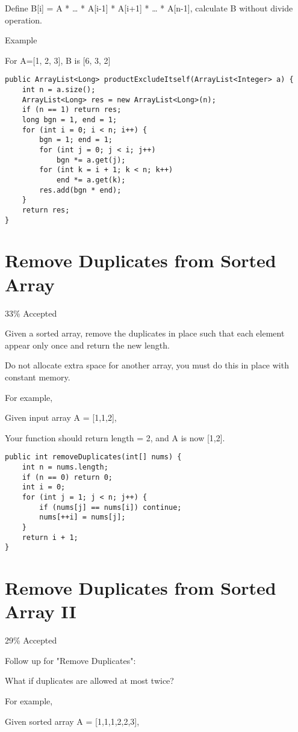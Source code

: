 \documentclass[9pt, b5paaper]{book}
\begin{document}
Define B[i] = A\footnotemark[1]{} * \ldots{} * A[i-1] * A[i+1] * \ldots{} * A[n-1], calculate B without divide operation.

Example

For A=[1, 2, 3], B is [6, 3, 2]
\begin{verbatim}
public ArrayList<Long> productExcludeItself(ArrayList<Integer> a) {
    int n = a.size();
    ArrayList<Long> res = new ArrayList<Long>(n);
    if (n == 1) return res;
    long bgn = 1, end = 1;
    for (int i = 0; i < n; i++) {
        bgn = 1; end = 1;
        for (int j = 0; j < i; j++) 
            bgn *= a.get(j);
        for (int k = i + 1; k < n; k++) 
            end *= a.get(k);
        res.add(bgn * end);
    }
    return res;
}
\end{verbatim}
\section{Remove Duplicates from Sorted Array}
\label{sec-1-54}

33\% Accepted

Given a sorted array, remove the duplicates in place such that each element appear only once and return the new length.

Do not allocate extra space for another array, you must do this in place with constant memory.

For example,

Given input array A = [1,1,2],

Your function should return length = 2, and A is now [1,2].
\begin{verbatim}
public int removeDuplicates(int[] nums) {
    int n = nums.length;
    if (n == 0) return 0;
    int i = 0;
    for (int j = 1; j < n; j++) {
        if (nums[j] == nums[i]) continue;
        nums[++i] = nums[j];
    }
    return i + 1;
}
\end{verbatim}
\section{Remove Duplicates from Sorted Array II}
\label{sec-1-55}

29\% Accepted

Follow up for "Remove Duplicates":

What if duplicates are allowed at most twice?

For example,

Given sorted array A = [1,1,1,2,2,3],
\end{document}
